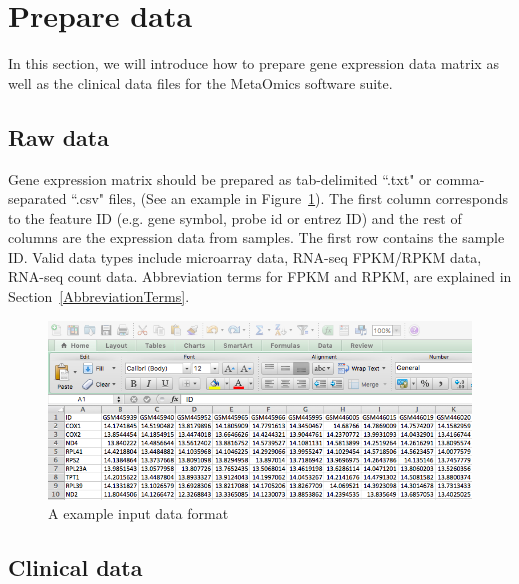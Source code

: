 
\section{Prepare data}
\label{sec:dataPrepare}
In this section, we will introduce how to prepare gene expression data matrix as well as the clinical data files for the MetaOmics software suite.

\subsection{Raw data}

Gene expression matrix should be prepared as tab-delimited ``.txt" or comma-separated ``.csv" files, (See an example in Figure~\ref{fig:dataMicroarray}).
The first column corresponds to the feature ID (e.g. gene symbol, probe id or entrez ID) and the rest of columns are the expression data from samples.
The first row contains the sample ID.
Valid data types include microarray data, RNA-seq FPKM/RPKM data, RNA-seq count data.
Abbreviation terms for FPKM and RPKM, are explained in Section~\ref{AbbreviationTerms}.

\begin{figure}[H]
\begin{center}
\includegraphics[scale=0.5]{./figure/dataPreparation/dataMicroarray_wide}
\caption{A example input data format}
\label{fig:dataMicroarray}
\end{center}
\end{figure}

\subsection{Clinical data}

